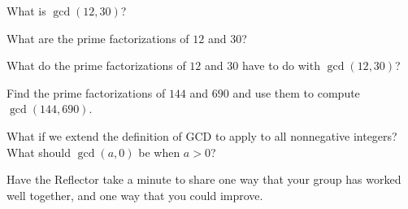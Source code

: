 \documentclass{tufte-handout}
\begin{document}
\begin{questions}
\item What is $\gcd(12,30)$?
\item What are the prime factorizations of $12$ and $30$?
\item What do the prime factorizations of $12$ and $30$ have to do
  with $\gcd(12,30)$?
\item Find the prime factorizations of $144$ and $690$ and use them to
  compute $\gcd(144, 690)$.
\item What if we extend the definition of GCD to apply to all
  nonnegative integers?  What should $\gcd(a,0)$ be when $a > 0$?
\item Have the Reflector take a minute to share one way that your
  group has worked well together, and one way that you could improve.
\end{questions}

\pause
\end{document}
